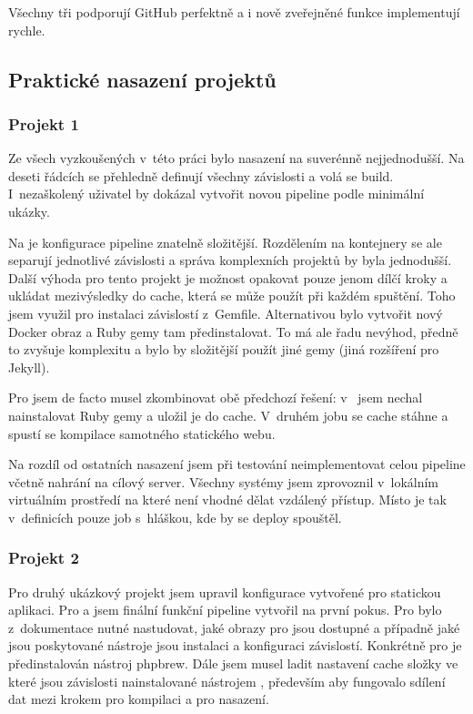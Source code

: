         Všechny tři \CI podporují GitHub perfektně a i nově zveřejněné funkce implementují rychle.

    \subsection{Praktické nasazení projektů}
        \subsubsection{Projekt 1}
            Ze všech \CI vyzkoušených v~této práci bylo nasazení na \travis suverénně nejjednodušší. Na deseti řádcích se přehledně definují všechny závislosti a volá se build. I~nezaškolený uživatel by dokázal vytvořit novou pipeline podle minimální ukázky.

            Na \circleci je konfigurace pipeline znatelně složitější. Rozdělením na kontejnery se ale separují jednotlivé závislosti a správa komplexních projektů by byla jednodušší. Další výhoda \circleci pro tento projekt je možnost opakovat pouze jenom dílčí kroky a ukládat mezivýsledky do cache, která se může použít při každém spuštění. Toho jsem využil pro instalaci závislostí z~Gemfile. Alternativou bylo vytvořit nový Docker obraz a Ruby gemy tam předinstalovat. To má ale řadu nevýhod, předně to zvyšuje komplexitu a bylo by složitější použít jiné gemy (jiná rozšíření pro Jekyll).

            Pro \semaphore jsem de facto musel zkombinovat obě předchozí řešení: v~ jsem nechal nainstalovat Ruby gemy a uložil je do cache. V~druhém jobu se cache stáhne a spustí se kompilace samotného statického webu.

            Na rozdíl od ostatních nasazení jsem při testování  neimplementovat celou \CI pipeline včetně nahrání na cílový server. Všechny systémy jsem zprovoznil v~lokálním virtuálním prostředí na které není vhodné dělat vzdálený přístup. Místo  je tak v~definicích pouze job s~hláškou, kde by se deploy spouštěl.

        \subsubsection{Projekt 2}
            Pro druhý ukázkový projekt jsem upravil konfigurace vytvořené pro statickou aplikaci. Pro \circleci a \travis jsem finální funkční pipeline vytvořil na první pokus. Pro \semaphore bylo z~dokumentace nutné nastudovat, jaké obrazy pro  jsou dostupné a případně jaké jsou poskytované nástroje jsou instalaci a konfiguraci závislostí. Konkrétně pro  je předinstalován nástroj phpbrew. Dále jsem musel ladit nastavení cache složky  ve které jsou závislosti nainstalované nástrojem , především aby fungovalo sdílení dat mezi krokem pro kompilaci a pro nasazení.

